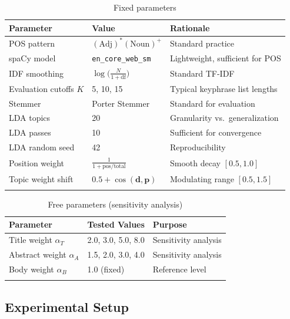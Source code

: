 \documentclass[pdflatex,sn-mathphys-num]{sn-jnl}
\begin{document}
\begin{table}[h]
\caption{Fixed parameters}\label{tab:fixed}
\begin{tabular*}{\textwidth}{@{\extracolsep\fill}lll@{}}
\toprule
Parameter & Value & Rationale \\
\midrule
POS pattern            & $(\text{Adj})^{*}(\text{Noun})^{+}$ & Standard practice \\
spaCy model            & \texttt{en\_core\_web\_sm}           & Lightweight, sufficient for POS \\
IDF smoothing          & $\log\!\bigl(\tfrac{N}{1+\text{df}}\bigr)$ & Standard TF-IDF \\
Evaluation cutoffs $K$ & 5, 10, 15                            & Typical keyphrase list lengths \\
Stemmer                & Porter Stemmer                       & Standard for evaluation \\
LDA topics             & 20                                   & Granularity vs.\ generalization \\
LDA passes             & 10                                   & Sufficient for convergence \\
LDA random seed        & 42                                   & Reproducibility \\
Position weight        & $\frac{1}{1+\text{pos}/\text{total}}$ & Smooth decay $[0.5,1.0]$ \\
Topic weight shift     & $0.5+\cos(\mathbf{d},\mathbf{p})$    & Modulating range $[0.5,1.5]$ \\
\botrule
\end{tabular*}
\end{table}

\begin{table}[h]
\caption{Free parameters (sensitivity analysis)}\label{tab:free}
\begin{tabular*}{\textwidth}{@{\extracolsep\fill}lll@{}}
\toprule
Parameter & Tested Values & Purpose \\
\midrule
Title weight $\alpha_T$    & 2.0, 3.0, 5.0, 8.0 & Sensitivity analysis \\
Abstract weight $\alpha_A$ & 1.5, 2.0, 3.0, 4.0 & Sensitivity analysis \\
Body weight $\alpha_B$     & 1.0 (fixed)         & Reference level \\
\botrule
\end{tabular*}
\end{table}

\subsection{Experimental Setup}\label{sec:setup}
\end{document}
